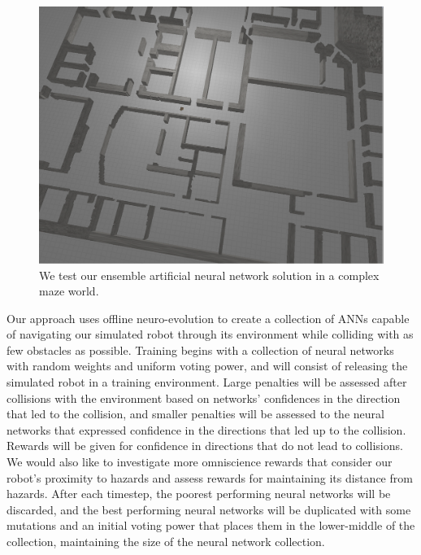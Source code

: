 \documentclass{article}
\begin{document}
		\begin{figure}[t]
			\begin{center}
				\includegraphics[width=\columnwidth]{world.png}
			\end{center}
			\caption{We test our ensemble artificial neural network solution in a complex maze world.}
			\label{world}
		\end{figure}

		Our approach uses offline neuro-evolution to create a collection of ANNs capable of navigating our simulated robot through its environment while colliding with as few obstacles as possible.  Training begins with a collection of neural networks with random weights and uniform voting power, and will consist of releasing the simulated robot in a training environment.  Large penalties will be assessed after collisions with the environment based on networks' confidences in the direction that led to the collision, and smaller penalties will be assessed to the neural networks that expressed confidence in the directions that led up to the collision.  Rewards will be given for confidence in directions that do not lead to collisions.  We would also like to investigate more omniscience rewards that consider our robot's proximity to hazards and assess rewards for maintaining its distance from hazards.  After each timestep, the poorest performing neural networks will be discarded, and the best performing neural networks will be duplicated with some mutations and an initial voting power that places them in the lower-middle of the collection, maintaining the size of the neural network collection. 
\end{document}

